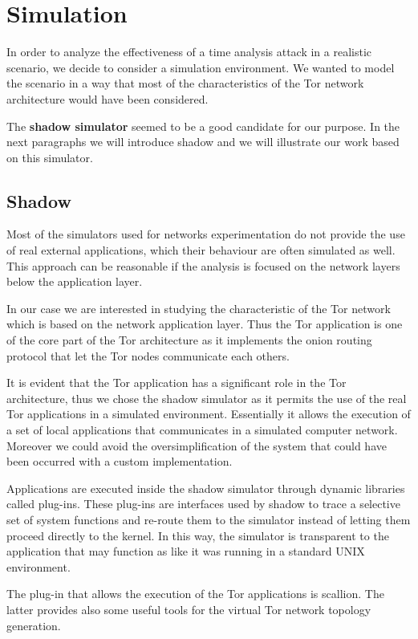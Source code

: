 \section{Simulation}
\label{sec:simulation}
In order to analyze the effectiveness of a time analysis attack in a
realistic scenario, we decide to consider a simulation environment.
We wanted to model the scenario in a way that most of the
characteristics of the Tor network architecture would have been
considered.

The \textbf{shadow simulator}\cite{shadow} seemed to be a good candidate for our purpose. In
the next paragraphs we will introduce shadow and we will illustrate our
work based on this simulator.
 
\subsection{Shadow}
\label{sec:Shadow}
Most of the simulators used for networks experimentation do not provide
the use of real external applications, which their
behaviour are often simulated as well. 
This approach can be reasonable if the analysis is focused on the 
network layers below the application layer. 

In our case we are interested in studying the characteristic of the Tor
network which is based on the network application layer.
Thus the Tor application is one of the core part of the Tor architecture as it implements the
onion routing protocol that let the Tor nodes communicate each others.

It is evident that the Tor application has a significant role in
the Tor architecture, thus we chose the shadow simulator as it permits
the use of the real Tor applications in a simulated environment.
Essentially it allows the execution of a set of local applications that
communicates in a simulated computer network. Moreover we could
avoid the oversimplification of the system that could have been occurred
with a custom implementation.

Applications are executed inside the shadow simulator through 
dynamic libraries called plug-ins. 
These plug-ins are interfaces used by shadow to trace a
selective set of system functions and re-route them to the simulator instead
of letting them proceed directly to the kernel. 
In this way, the simulator is transparent to the application
that may function as like it was running in a standard UNIX environment. 

The plug-in that allows the execution of the Tor applications is
scallion. The latter provides also some useful tools for the virtual
Tor network topology generation.

